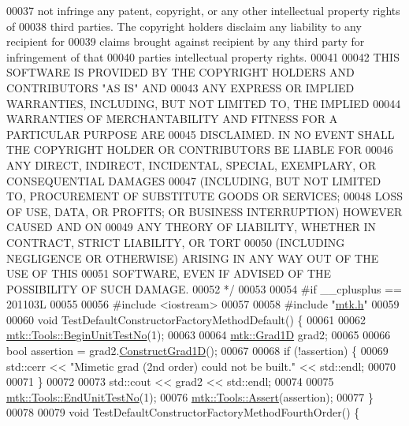 \begin{DoxyCode}
00037 \textcolor{comment}{not infringe any patent, copyright, or any other intellectual property rights of}
00038 \textcolor{comment}{third parties. The copyright holders disclaim any liability to any recipient for}
00039 \textcolor{comment}{claims brought against recipient by any third party for infringement of that}
00040 \textcolor{comment}{parties intellectual property rights.}
00041 \textcolor{comment}{}
00042 \textcolor{comment}{THIS SOFTWARE IS PROVIDED BY THE COPYRIGHT HOLDERS AND CONTRIBUTORS "AS IS" AND}
00043 \textcolor{comment}{ANY EXPRESS OR IMPLIED WARRANTIES, INCLUDING, BUT NOT LIMITED TO, THE IMPLIED}
00044 \textcolor{comment}{WARRANTIES OF MERCHANTABILITY AND FITNESS FOR A PARTICULAR PURPOSE ARE}
00045 \textcolor{comment}{DISCLAIMED. IN NO EVENT SHALL THE COPYRIGHT HOLDER OR CONTRIBUTORS BE LIABLE FOR}
00046 \textcolor{comment}{ANY DIRECT, INDIRECT, INCIDENTAL, SPECIAL, EXEMPLARY, OR CONSEQUENTIAL DAMAGES}
00047 \textcolor{comment}{(INCLUDING, BUT NOT LIMITED TO, PROCUREMENT OF SUBSTITUTE GOODS OR SERVICES;}
00048 \textcolor{comment}{LOSS OF USE, DATA, OR PROFITS; OR BUSINESS INTERRUPTION) HOWEVER CAUSED AND ON}
00049 \textcolor{comment}{ANY THEORY OF LIABILITY, WHETHER IN CONTRACT, STRICT LIABILITY, OR TORT}
00050 \textcolor{comment}{(INCLUDING NEGLIGENCE OR OTHERWISE) ARISING IN ANY WAY OUT OF THE USE OF THIS}
00051 \textcolor{comment}{SOFTWARE, EVEN IF ADVISED OF THE POSSIBILITY OF SUCH DAMAGE.}
00052 \textcolor{comment}{*/}
00053 
00054 \textcolor{preprocessor}{#if \_\_cplusplus == 201103L}
00055 
00056 \textcolor{preprocessor}{#include <iostream>}
00057 
00058 \textcolor{preprocessor}{#include "\hyperlink{mtk_8h}{mtk.h}"}
00059 
00060 \textcolor{keywordtype}{void} TestDefaultConstructorFactoryMethodDefault() \{
00061 
00062   \hyperlink{classmtk_1_1Tools_a26ee906d28523378522a75e25c3a4e19}{mtk::Tools::BeginUnitTestNo}(1);
00063 
00064   \hyperlink{classmtk_1_1Grad1D}{mtk::Grad1D} grad2;
00065 
00066   \textcolor{keywordtype}{bool} assertion = grad2.\hyperlink{classmtk_1_1Grad1D_a74ef5245cfae6fd158bd7f563a0c2e52}{ConstructGrad1D}();
00067 
00068   \textcolor{keywordflow}{if} (!assertion) \{
00069     std::cerr << \textcolor{stringliteral}{"Mimetic grad (2nd order) could not be built."} << std::endl;
00070 
00071   \}
00072 
00073   std::cout << grad2 << std::endl;
00074 
00075   \hyperlink{classmtk_1_1Tools_ad8cf0085133dd40c913fe195bc5b9694}{mtk::Tools::EndUnitTestNo}(1);
00076   \hyperlink{classmtk_1_1Tools_aa311fada9255627d06c56b1e4fedce9e}{mtk::Tools::Assert}(assertion);
00077 \}
00078 
00079 \textcolor{keywordtype}{void} TestDefaultConstructorFactoryMethodFourthOrder() \{

\end{DoxyCode}
